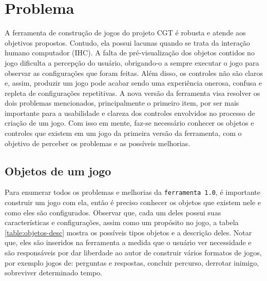 \documentclass[12pt,twoside,openright,a4paper,english,brazil,sumario=tradicional]{abntex2}
\begin{document}
\chapter{Problema}
\label{chap:problemas}
A ferramenta de construção de jogos do projeto CGT é robusta e atende aos objetivos propostos. Contudo, ela possui lacunas quando se trata da interação humano computador (IHC).
A falta de pré-visualização dos objetos contidos no jogo dificulta a percepção do usuário, obrigando-o a sempre executar o jogo para observar as configurações que foram feitas.
Além disso, os controles não são claros e, assim, produzir um jogo pode acabar sendo uma experiência onerosa, confusa e repleta de configurações repetitivas.
A nova versão da ferramenta visa resolver os dois problemas mencionados, principalmente o primeiro item, por ser mais importante para a usabilidade e clareza dos controles envolvidos no processo de criação de um jogo.
Com isso em mente, faz-se necessário conhecer os objetos e controles que existem em um jogo da primeira versão da ferramenta, com o objetivo de perceber os problemas e as possíveis melhorias.

\section{Objetos de um jogo}
\label{sec:objetos}

Para enumerar todos os problemas e melhorias da \texttt{ferramenta 1.0}, é importante construir um jogo com ela, então é preciso conhecer os objetos que existem nele e como eles são configurados. Observar que, cada um deles possui suas características e configurações, assim como um propósito no jogo, a tabela \ref{table:objetos-desc} mostra os possíveis tipos objetos e a descrição deles. Notar que, eles são inseridos na ferramenta a medida que o usuário ver necessidade e são responsáveis por dar liberdade ao autor de construir vários formatos de jogos, por exemplo jogos de: perguntas e respostas, concluir percurso, derrotar inimigo, sobreviver determinado tempo.
\end{document}
